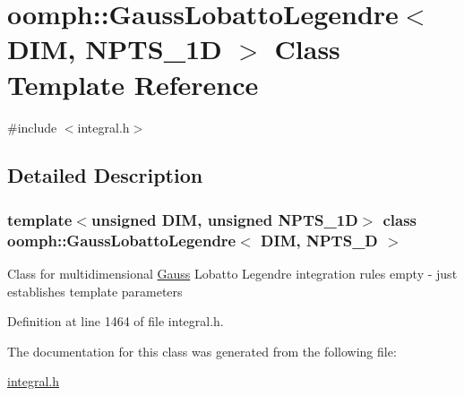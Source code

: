 \hypertarget{classoomph_1_1GaussLobattoLegendre}{}\section{oomph\+:\+:Gauss\+Lobatto\+Legendre$<$ D\+IM, N\+P\+T\+S\+\_\+1D $>$ Class Template Reference}
\label{classoomph_1_1GaussLobattoLegendre}


{\ttfamily \#include $<$integral.\+h$>$}



\subsection{Detailed Description}
\subsubsection*{template$<$unsigned D\+IM, unsigned N\+P\+T\+S\+\_\+1D$>$\newline
class oomph\+::\+Gauss\+Lobatto\+Legendre$<$ D\+I\+M, N\+P\+T\+S\+\_\+D $>$}

Class for multidimensional \hyperlink{classoomph_1_1Gauss}{Gauss} Lobatto Legendre integration rules empty -\/ just establishes template parameters 

Definition at line 1464 of file integral.\+h.



The documentation for this class was generated from the following file\+:\begin{DoxyCompactItemize}
\item 
\hyperlink{integral_8h}{integral.\+h}\end{DoxyCompactItemize}
